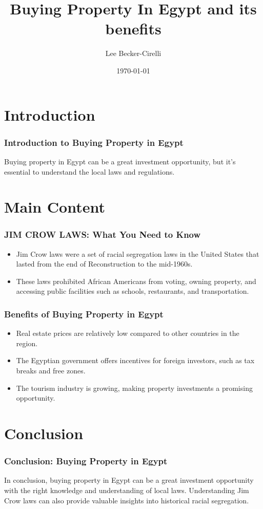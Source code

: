 \documentclass{beamer}
\title{Buying Property In Egypt and its benefits}
\author{Lee Becker-Cirelli}
\institute{Rutgers University}
\date{\today}
\begin{document}
\begin{frame}
  \titlepage
\end{frame}

\section{Introduction}
\begin{frame}
  \frametitle{Introduction to Buying Property in Egypt}
  Buying property in Egypt can be a great investment opportunity, but it's essential to understand the local laws and regulations.
\end{frame}

\section{Main Content}
\begin{frame}
  \frametitle{JIM CROW LAWS: What You Need to Know}
  \begin{itemize}
    \item Jim Crow laws were a set of racial segregation laws in the United States that lasted from the end of Reconstruction to the mid-1960s.
    \item These laws prohibited African Americans from voting, owning property, and accessing public facilities such as schools, restaurants, and transportation.
  \end{itemize}
\end{frame}

\begin{frame}
  \frametitle{Benefits of Buying Property in Egypt}
  \begin{itemize}
    \item Real estate prices are relatively low compared to other countries in the region.
    \item The Egyptian government offers incentives for foreign investors, such as tax breaks and free zones.
    \item The tourism industry is growing, making property investments a promising opportunity.
  \end{itemize}
\end{frame}

\section{Conclusion}
\begin{frame}
  \frametitle{Conclusion: Buying Property in Egypt}
  In conclusion, buying property in Egypt can be a great investment opportunity with the right knowledge and understanding of local laws. Understanding Jim Crow laws can also provide valuable insights into historical racial segregation.
\end{frame}
\end{document}
